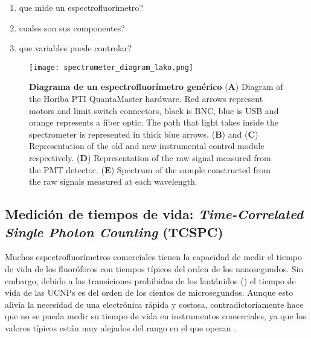 \begin{enumerate}
    \item que mide un espectrofluorimetro?
    \item cuales son sus componentes?
    \item que variables puede controlar?
\end{enumerate}

\begin{SCfigure}
     \centering
     \texttt{[image: spectrometer\_diagram\_lako.png]}
     \caption{
    \textbf{Diagrama de un espectrofluorímetro genérico}
    (\textbf{A}) Diagram of the Horiba PTI QuantaMaster hardware. Red arrows represent motors and limit switch connectors, black is BNC, blue is USB and orange represents a fiber optic. The path that light takes inside the spectrometer is represented in thick blue arrows. 
    (\textbf{B}) and (\textbf{C}) Representation of the old and new instrumental control module respectively.
    (\textbf{D}) Representation of the raw signal measured from the PMT detector.
    (\textbf{E}) Spectrum of the sample constructed from the raw signals measured at each wavelength.
    }
     \label{fig:spec_diagram_lako}
\end{SCfigure}


\subsection{Medición de tiempos de vida: \textit{Time-Correlated Single Photon Counting} (TCSPC) }

Muchos espectrofluorímetros comerciales tienen la capacidad de medir el tiempo de vida de los fluoróforos con tiempos típicos del orden de los nanosegundos. 
Sin embargo, debido a las transiciones prohibidas de los lantánidos () el tiempo de vida de las UCNPs es del orden de los cientos de microsegundos.
Aunque esto alivia la necesidad de una electrónica rápida y costosa, contradictoriamente hace que no se pueda medir su tiempo de vida en instrumentos comerciales, ya que los valores típicos están muy alejados del rango en el que operan \cite{bujjamer2020}.


